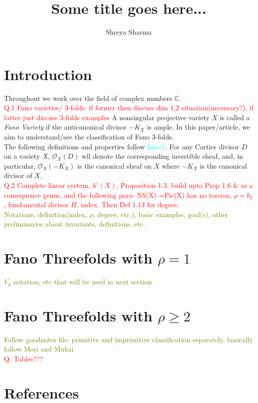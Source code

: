 \documentclass[12pt]{amsart}
\begin{document}
	\title{\large{Some title goes here...}}
	\date{}
	\author{\small{Shreya Sharma}}
	\maketitle
	\tableofcontents
	
\section{Introduction}
\noindent Throughout we work over the field of complex numbers $\mathbb{C}$. \\
\textcolor{red}{Q.1 Fano varieties/ 3-folds: if former then discuss dim 1,2 situation(necessary?), if latter just discuss 3-folds examples}
A nonsingular projective variety $X$ is called a \textit{Fano Variety} if the anticanonical divisor $-K_X$ is ample. In this paper/article, we aim to understand/see the classification of Fano 3-folds. \\

	The following definitions and properties follow \textcolor{cyan}{Isko-1}. For any Cartier divisor $D$ on a variety $X$, $\mathcal{O}_X(D)$ wll denote the corresponding invertible sheaf, and, in particular, $\mathcal{O}_X(-K_X)$ is the canonical sheaf on $X$ where $-K_X$ is the canonical divisor of $X$. \\
	\textcolor{red}{ Q.2 Complete linear system, $h^i(X)$, Proposition 1.3, build upto Prop 1.6 \& as a consequence genus, and the following para- NS(X) =Pic(X) has no torsion, $\rho=b_2$, fundamental divisor $H$, index. Then Def 1.13 for degree.}\\
	  
	\textcolor{olive}{Notations, definition(index, $\rho$, degree, etc.), basic examples, goal(s), other preliminaries about invariants, definitions, etc.}
	\section{Fano Threefolds with $\rho =1$}
	\textcolor{olive}{ $V_d$ notation, etc that will be used in next section}
	\section{Fano Threefolds with $\rho \geq 2$}
	\textcolor{olive}{Follow goodnotes file: primitive and imprimitive classification separately, basically follow Mori and Mukai}\\ 
	\textcolor{red}{Q. Tables???}
	\section{References}
\end{document}
